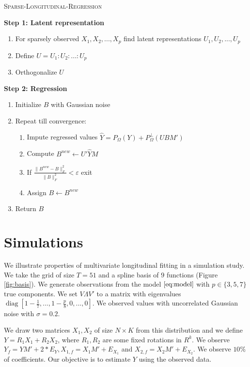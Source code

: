 \documentclass[preprint]{imsart}
\numberwithin{equation}{section}
\theoremstyle{plain}
\DeclareMathOperator*{\diag}{diag}
\begin{document}
\begin{algorithm}
\caption{\textsc{Sparse-Longitudinal-Regression}\label{alg:sparse-regression}}
\vspace{3pt}
\begin{flushleft}
\textbf{Step 1: Latent representation}
\end{flushleft}
\begin{enumerate}
\item For sparsely observed $X_1,X_2,...,X_p$ find latent representations $U_1,U_2,...,U_p$
\item Define $U = U_1:U_2:...:U_p$
\item Orthogonalize $U$
\end{enumerate}
\begin{flushleft}
\textbf{Step 2: Regression}
\end{flushleft}
\begin{enumerate}
\item Initialize $B$ with Gaussian noise
\item Repeat till convergence:
\begin{enumerate}
\item Impute regressed values $\hat{Y} = P_\Omega(Y) + P_\Omega^\perp(UBM')$
\item Compute $B^{new} \leftarrow U'\hat{Y}M$
\item If $\frac{\|B^{new} - B\|_F^2}{\|B\|_F^2} < \varepsilon$ exit
\item Assign $B \leftarrow B^{new}$
\end{enumerate}
\item Return $B$
\end{enumerate}
\end{algorithm}


\section{Simulations}\label{s:simulation}

We illustrate properties of multivariate longitudinal fitting in a simulation study. We take the grid of size $T = 51$ and a spline basis of $9$ functions (Figure \ref{fig:basis}). We generate observations from the model $\eqref{eq:model}$ with $p \in \{3,5,7\}$ true components. We set $V\Lambda V'$ to a matrix with eigenvalues $\diag[1-\frac{1}{7},...,1 - \frac{p}{8},0,...,0]$. We observed values with uncorrelated Gaussian noise with $\sigma = 0.2$. 

We draw two matrices $X_1,X_2$ of size $N \times K$ from this distribution and we define $Y = R_1 X_1 + R_2 X_2$, where $R_1,R_2$ are some fixed rotations in $R^k$. We observe $Y_f = YM' + 2* E_Y, X_{1,f} = X_1M' + E_{X_1}$ and $X_{2,f} = X_2 M' + E_{X_2}$. We observe $10\%$ of coefficients. Our objective is to estimate $Y$ using the observed data.
\end{document}
